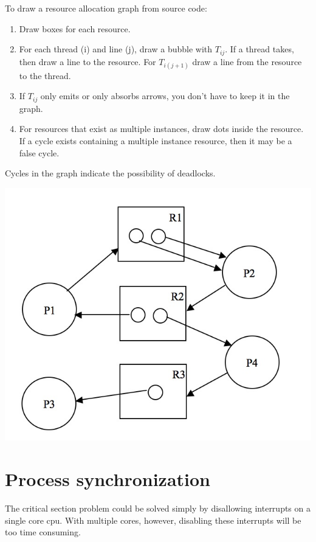 \documentclass[a4paper]{article}
\begin{document}
To draw a resource allocation graph from source code:
\begin{enumerate}
  \item Draw boxes for each resource.
  \item For each thread (i) and line (j), draw a bubble with $T_{ij}$. If a thread
        takes, then draw a line to the resource. For $T_{i(j+1)}$ draw a line from the
        resource to the thread.
  \item If $T_{ij}$ only emits or only absorbs arrows, you don't have to keep
        it in the graph.
  \item For resources that exist as multiple instances, draw dots inside the resource.
        If a cycle exists containing a multiple instance resource, then it may be a
        false cycle.
\end{enumerate}

Cycles in the graph indicate the possibility of deadlocks.
\begin{center}
  \includegraphics[scale=0.2]{res_alloc}
\end{center}

\section{Process synchronization}

The critical section problem could be solved simply by disallowing interrupts
on a single core cpu. With multiple cores, however, disabling these interrupts
will be too time consuming.
\end{document}

